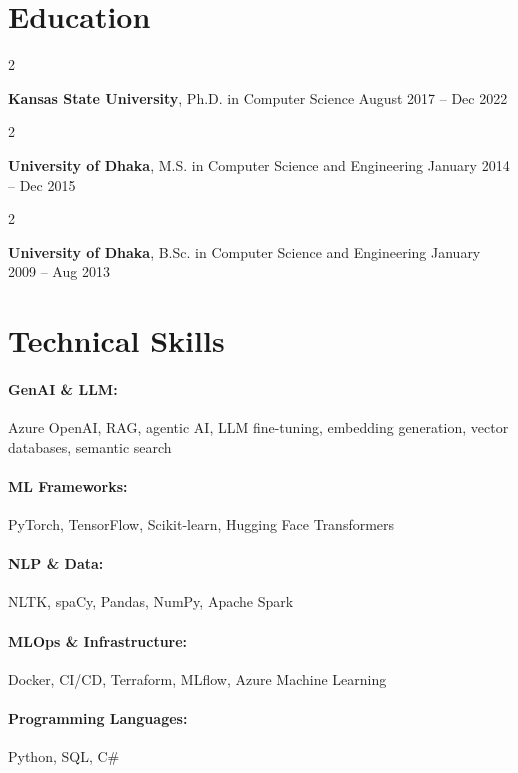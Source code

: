 \documentclass[10pt, letterpaper]{article}
\newenvironment{twocolentry}[2][]{
    \onecolentry
    \def\secondColumn{#2}
    \setcolumnwidth{\fill, 4.5 cm}
    \begin{paracol}{2}
}{
    \switchcolumn \raggedleft \secondColumn
    \end{paracol}
    \endonecolentry
} %
\begin{document}
\section{Education}

        \begin{twocolentry}{
            August 2017 -- Dec 2022
        }
            \textbf{Kansas State University}, Ph.D. in Computer Science\end{twocolentry}

        \begin{twocolentry}{
            January 2014 -- Dec 2015
        }
            \textbf{University of Dhaka}, M.S. in Computer Science and Engineering\end{twocolentry}

        \begin{twocolentry}{
            January 2009 -- Aug 2013
        }
            \textbf{University of Dhaka}, B.Sc. in Computer Science and Engineering\end{twocolentry}

\vspace{-1mm}
\section{Technical Skills}

        \paragraph{GenAI \& LLM:} Azure OpenAI, RAG, agentic AI, LLM fine-tuning, embedding generation, vector databases, semantic search
        \vspace{-4mm}
        \paragraph{ML Frameworks:} PyTorch, TensorFlow, Scikit-learn, Hugging Face Transformers
        \vspace{-4mm}
        \paragraph{NLP \& Data:} NLTK, spaCy, Pandas, NumPy, Apache Spark
        \vspace{-4mm}
        \paragraph{MLOps \& Infrastructure:} Docker, CI/CD, Terraform, MLflow, Azure Machine Learning
        \vspace{-4mm}
        \paragraph{Programming Languages:} Python, SQL, C\#
\end{document}
